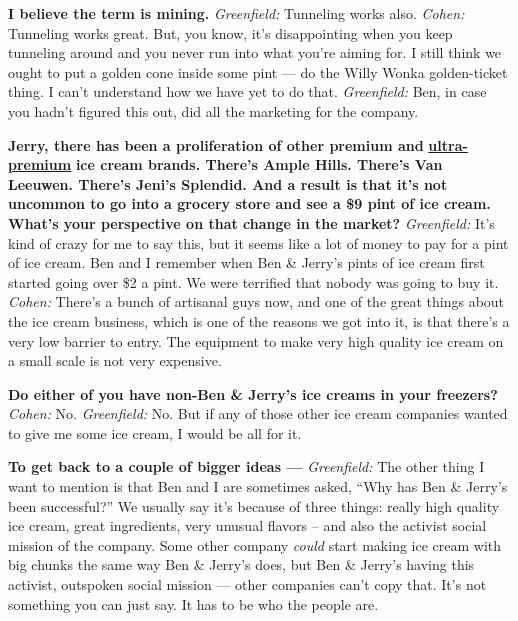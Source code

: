 \textbf{I believe the term is mining.} \emph{Greenfield:} Tunneling
works also. \emph{Cohen:} Tunneling works great. But, you know, it's
disappointing when you keep tunneling around and you never run into what
you're aiming for. I still think we ought to put a golden cone inside
some pint --- do the Willy Wonka golden-ticket thing. I can't understand
how we have yet to do that. \emph{Greenfield:} Ben, in case you hadn't
figured this out, did all the marketing for the company.

\textbf{Jerry, there has been a proliferation of other premium and}
\textbf{\href{http://nytimes.com\#tooltip-9}{ultra-premium}} \textbf{ice
cream brands. There's Ample Hills. There's Van Leeuwen. There's Jeni's
Splendid. And a result is that it's not uncommon to go into a grocery
store and see a \$9 pint of ice cream. What's your perspective on that
change in the market?} \emph{Greenfield:} It's kind of crazy for me to
say this, but it seems like a lot of money to pay for a pint of ice
cream. Ben and I remember when Ben \& Jerry's pints of ice cream first
started going over \$2 a pint. We were terrified that nobody was going
to buy it. \emph{Cohen:} There's a bunch of artisanal guys now, and one
of the great things about the ice cream business, which is one of the
reasons we got into it, is that there's a very low barrier to entry. The
equipment to make very high quality ice cream on a small scale is not
very expensive.

\textbf{Do either of you have non-Ben \& Jerry's ice creams in your
freezers?} \emph{Cohen:} No. \emph{Greenfield:} No. But if any of those
other ice cream companies wanted to give me some ice cream, I would be
all for it.

\textbf{To get back to a couple of bigger ideas ---} \emph{Greenfield:}
The other thing I want to mention is that Ben and I are sometimes asked,
``Why has Ben \& Jerry's been successful?'' We usually say it's because
of three things: really high quality ice cream, great ingredients, very
unusual flavors -- and also the activist social mission of the company.
Some other company \emph{could} start making ice cream with big chunks
the same way Ben \& Jerry's does, but Ben \& Jerry's having this
activist, outspoken social mission --- other companies can't copy that.
It's not something you can just say. It has to be who the people are.

